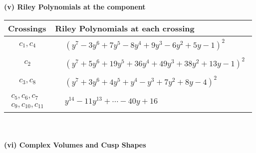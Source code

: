 \documentclass[1p]{elsarticle_modified}
\theoremstyle{definition}
\begin{document}
\newpage\renewcommand{\arraystretch}{1}
\flushleft \textbf{(v) Riley Polynomials at the component}\newline \\
\begin{tabular}{m{50pt}|m{274pt}}
Crossings & \hspace{64pt}Riley Polynomials at each crossing \\
\hline $$\begin{aligned}c_{1},c_{4}\end{aligned}$$&$\begin{aligned}
&(y^7-3 y^6+7 y^5-8 y^4+9 y^3-6 y^2+5 y-1)^2
\end{aligned}$\\
\hline $$\begin{aligned}c_{2}\end{aligned}$$&$\begin{aligned}
&(y^7+5 y^6+19 y^5+36 y^4+49 y^3+38 y^2+13 y-1)^2
\end{aligned}$\\
\hline $$\begin{aligned}c_{3},c_{8}\end{aligned}$$&$\begin{aligned}
&(y^7+3 y^6+4 y^5+y^4- y^3+7 y^2+8 y-4)^2
\end{aligned}$\\
\hline $$\begin{aligned}c_{5},c_{6},c_{7}\\c_{9},c_{10},c_{11}\end{aligned}$$&$\begin{aligned}
&y^{14}-11 y^{13}+\cdots-40 y+16
\end{aligned}$\\
\hline
\end{tabular}\\~\\
\newpage\flushleft \textbf{(vi) Complex Volumes and Cusp Shapes}
\end{document}

